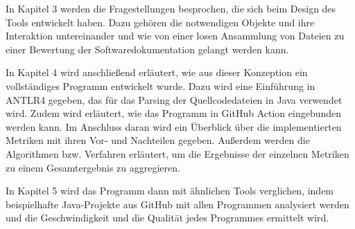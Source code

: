 In Kapitel 3 werden die Fragestellungen besprochen, die sich beim Design des Tools entwickelt haben. Dazu gehören die notwendigen Objekte und ihre Interaktion untereinander und wie von einer losen Ansammlung von Dateien zu einer Bewertung der Softwaredokumentation gelangt werden kann.

In Kapitel 4 wird anschließend erläutert, wie aus dieser Konzeption ein vollständiges Programm entwickelt wurde. Dazu wird eine Einführung in ANTLR4 gegeben, das für das Parsing der Quellcodedateien in Java verwendet wird. Zudem wird erläutert, wie das Programm in GitHub Action eingebunden werden kann. Im Anschluss daran wird ein Überblick über die implementierten Metriken mit ihren Vor- und Nachteilen gegeben. Außerdem werden die Algorithmen bzw. Verfahren erläutert, um die Ergebnisse der einzelnen Metriken zu einem Gesamtergebnis zu aggregieren. 

In Kapitel 5 wird das Programm dann mit ähnlichen Tools verglichen, indem beispielhafte Java-Projekte aus GitHub mit allen Programmen analysiert werden und die Geschwindigkeit und die Qualität jedes Programmes ermittelt wird. 
